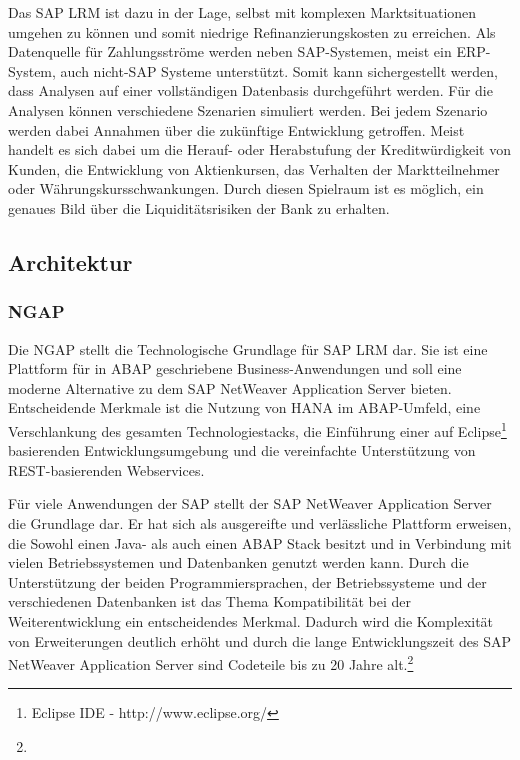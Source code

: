 Das SAP LRM ist dazu in der Lage, selbst mit komplexen Marktsituationen umgehen zu können und somit niedrige Refinanzierungskosten zu erreichen. Als Datenquelle für Zahlungsströme werden neben SAP-Systemen, meist ein \gls{ERP}-System, auch nicht-SAP Systeme unterstützt. Somit kann sichergestellt werden, dass Analysen auf einer vollständigen Datenbasis durchgeführt werden. Für die Analysen können verschiedene Szenarien simuliert werden. Bei jedem Szenario werden dabei Annahmen über die zukünftige Entwicklung getroffen. Meist handelt es sich dabei um die Herauf- oder Herabstufung der Kreditwürdigkeit von Kunden, die Entwicklung von Aktienkursen, das Verhalten der Marktteilnehmer oder Währungskursschwankungen. Durch diesen Spielraum ist es möglich, ein genaues Bild über die Liquiditätsrisiken der Bank zu erhalten.


\subsection{Architektur}


\subsubsection{NGAP}
Die \gls{NGAP} stellt die Technologische Grundlage für SAP LRM dar. Sie ist eine Plattform für in ABAP geschriebene Business-Anwendungen und soll eine moderne Alternative zu dem SAP NetWeaver Application Server bieten. Entscheidende Merkmale ist die Nutzung von \gls{HANA} im ABAP-Umfeld, eine Verschlankung des gesamten Technologiestacks, die Einführung einer auf Eclipse\footnote{Eclipse IDE - http://www.eclipse.org/} basierenden Entwicklungsumgebung und die vereinfachte Unterstützung von REST-basierenden Webservices.

Für viele Anwendungen der SAP stellt der SAP NetWeaver Application Server die Grundlage dar. Er hat sich als ausgereifte und verlässliche Plattform erweisen, die Sowohl einen Java- als auch einen ABAP Stack besitzt und in Verbindung mit vielen Betriebssystemen und Datenbanken genutzt werden kann. Durch die Unterstützung der beiden Programmiersprachen, der Betriebssysteme und der verschiedenen Datenbanken ist das Thema Kompatibilität bei der Weiterentwicklung ein entscheidendes Merkmal. Dadurch wird die Komplexität von Erweiterungen deutlich erhöht und durch die lange Entwicklungszeit des SAP NetWeaver Application Server sind Codeteile bis zu 20 Jahre alt.\footnote{ }

